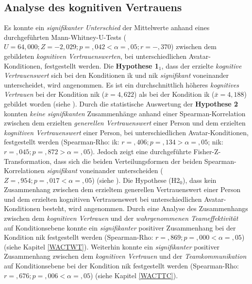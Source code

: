 \documentclass[a4paper,11pt]{article}%
\renewcommand{\\}{\vspace*{0.5\baselineskip} \newline}
\begin{document}
{\subsection{Analyse des kognitiven Vertrauens}
Es konnte ein \textit{signifikanter Unterschied} der Mittelwerte anhand eines durchgeführten Mann-Whitney-U-Tests ($U = 64,000; Z = -2,029; p =,042 < \alpha =,05; r =-,370$) zwischen dem gebildeten \textit{kognitiven Vertrauenswerten}, bei unterschiedlichen Avatar-Konditionen, festgestellt werden. 
Die \textbf{Hypothese 1$_{1}$}, dass der erzielte \textit{kognitive Vertrauenswert} sich bei den Konditionen \ac{ik} und \ac{nik} \textit{signifikant} voneinander unterscheidet, wird angenommen. Es ist ein durchschnittlich höheres \textit{kognitives Vertrauen} bei der Kondition \ac{nik} ($\bar{x}=4,622$) als bei der Kondition \ac{ik} ($\bar{x}= 4,188$) gebildet worden (siehe ).\\
Durch die statistische Auswertung der \textbf{Hypothese 2} konnten \textit{keine signifikanten} Zusammenhänge anhand einer Spearman-Korrelation zwischen dem erzielten \textit{generellen Vertrauenswert} einer Person und dem erzielten \textit{kognitiven Vertrauenswert} einer Person, bei unterschiedlichen Avatar-Konditionen, festgestellt werden (Spearman-Rho: \ac{ik}: $r =,406; p =,134 > \alpha =,05$; \ac{nik}: $r = ,045; p = ,872 > \alpha = ,05$). Jedoch zeigt eine durchgeführte Fisher-Z-Transformation, dass sich die beiden Verteilungsformen der beiden Spearman-Korrelationen \textit{signifikant} voneinander unterscheiden ($Z =,954;p =,017 < \alpha =,05$) (siehe ).\\
Die Hypothese (H2$_{0}$), dass kein Zusammenhang zwischen dem erzieltem generellen Vertrauenswert einer Person und dem erzielten kognitiven Vertrauenswert bei unterschiedlichen Avatar-Konditionen besteht, wird angenommen.\\
Durch eine Analyse des Zusammenhangs zwischen dem \textit{kognitiven Vertrauen} und der \textit{wahrgenommenen Teameffektivität} auf Konditionsebene konnte ein \textit{signifikanter} positiver Zusammenhang bei der Kondition \ac{nik} festgestellt werden (Spearman-Rho: $r =,869; p =,000 < \alpha = ,05$) (siehe Kapitel \ref{WACTWT}).
Weiterhin konnte ein \textit{signifikanter} positiver Zusammenhang zwischen dem \textit{kognitiven Vertrauen} und der \textit{Teamkommunikation} auf Konditionsebene bei der Kondition \ac{nik} festgestellt werden (Spearman-Rho: $r =,676; p =,006 < \alpha = ,05$) (siehe Kapitel \ref{WACTTC}).

}
\end{document}
